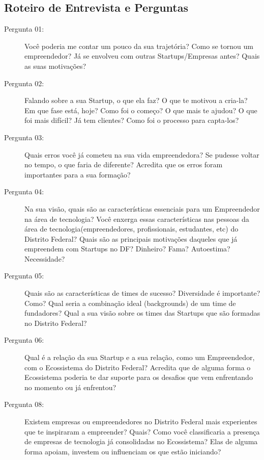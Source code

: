 \subsection{Roteiro de Entrevista e Perguntas}
\label{subsection:roteiro_de_entrevista_e_perguntas}

\begin{description}
  \item [Pergunta 01:] Você poderia me contar um pouco da sua trajetória? Como se tornou um empreendedor? Já se envolveu com outras Startups/Empresas antes? Quais as suas motivações? 

  \item [Pergunta 02:] Falando sobre a sua Startup, o que ela faz? O que te motivou a cria-la? Em que fase está, hoje? Como foi o começo? O que mais te ajudou? O que foi mais difícil? Já tem clientes? Como foi o processo para capta-los?

  \item [Pergunta 03:] Quais erros você já cometeu na sua vida empreendedora? Se pudesse voltar no tempo, o que faria de diferente? Acredita que os erros foram importantes para a sua formação?

  \item [Pergunta 04:] Na sua visão, quais são as características essenciais para um Empreendedor na área de tecnologia? Você enxerga essas características nas pessoas da área de tecnologia(empreendedores, profissionais, estudantes, etc) do Distrito Federal? Quais são as principais motivações daqueles que já empreendem com Startups no DF? Dinheiro? Fama? Autoestima? Necessidade?

  \item [Pergunta 05:] Quais são as características de times de sucesso? Diversidade é importante? Como? Qual seria a combinação ideal (backgrounds) de um time de fundadores? Qual a sua visão sobre os times das Startups que são formadas no Distrito Federal?
  
  \item [Pergunta 06:] Qual é a relação da sua Startup e a sua relação, como um Empreendedor, com o Ecossistema do Distrito Federal? Acredita que de alguma forma o Ecossistema poderia te dar suporte para os desafios que vem enfrentando no momento ou já enfrentou?

  \item [Pergunta 08:] Existem empresas ou empreendedores no Distrito Federal mais experientes que te inspiraram a empreender? Quais? Como você classificaria a presença de empresas de tecnologia já consolidadas no Ecossistema? Elas de alguma forma apoiam, investem ou influenciam os que estão iniciando?  
  

\end{description}
